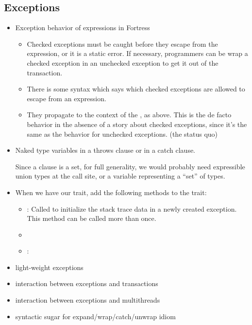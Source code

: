 \subsection{Exceptions}
\begin{itemize}
\item Exception behavior of  expressions in Fortress
  \begin{itemize}
  \item Checked exceptions must be caught before they escape from the  expression, or it is a static error.  If necessary, programmers can be wrap a checked exception in an unchecked exception to get it out of the transaction.
  \item There is some syntax which says which checked exceptions are allowed to escape from an  expression.
  \item They propagate to the context of the , as above.  This is the de facto behavior in the absence of a story about checked exceptions, since it's the same as the behavior for unchecked exceptions. (the status quo)
  \end{itemize}
\item Naked type variables in a throws clause or in a catch clause.

Since a  clause is a set, for full generality, we would
probably need expressible union types at the call site,
or a variable representing a ``set'' of types.

\item When we have our  trait,
add the following methods to the  trait:
\begin{itemize}
\item {}:
Called to initialize the stack trace data in a newly created exception.
This method can be called more than once.
\item {}
\item {}:
\end{itemize}

\item light-weight exceptions
\item interaction between exceptions and transactions
\item interaction between exceptions and multithreads

\item syntactic sugar for expand/wrap/catch/unwrap idiom


\end{itemize}
